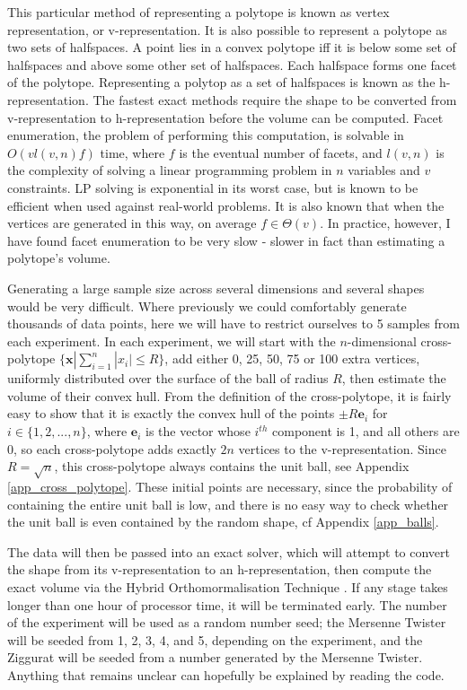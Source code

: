This particular method of representing a polytope is known as vertex representation, or v-representation. It is also possible to represent a polytope as two sets of halfspaces. A point lies in a convex polytope iff it is below some set of halfspaces and above some other set of halfspaces. Each halfspace forms one facet of the polytope. Representing a polytop as a set of halfspaces is known as the h-representation. The fastest exact methods require the shape to be converted from v-representation to h-representation before the volume can be computed. Facet enumeration, the problem of performing this computation, is solvable in $O(vl(v,n)f)$ time\cite{Fukuda97}, where $f$ is the eventual number of facets, and $l(v,n)$ is the complexity of solving a linear programming problem in $n$ variables and $v$ constraints. LP solving is exponential in its worst case\cite{Klee72}, but is known to be efficient when used against real-world problems. It is also known that when the vertices are generated in this way, on average $f \in \Theta(v)$. In practice, however, I have found facet enumeration to be very slow - slower in fact than estimating a polytope's volume.

Generating a large sample size across several dimensions and several shapes would be very difficult. Where previously we could comfortably generate thousands of data points, here we will have to restrict ourselves to 5 samples from each experiment. In each experiment, we will start with the $n$-dimensional cross-polytope $\{{\bm x} | \sum^n_{i=1}|x_i| \leqslant R\}$, add either 0, 25, 50, 75 or 100 extra vertices, uniformly distributed over the surface of the ball of radius $R$, then estimate the volume of their convex hull. From the definition of the cross-polytope, it is fairly easy to show that it is exactly the convex hull of the points $\pm R{\bm e}_i$ for $i \in \{1,2,...,n\}$, where ${\bm e}_i$ is the vector whose $i^{th}$ component is 1, and all others are 0, so each cross-polytope adds exactly $2n$ vertices to the v-representation. Since $R=\sqrt{n}$, this cross-polytope always contains the unit ball, see Appendix \ref{app_cross_polytope}. These initial points are necessary, since the probability of containing the entire unit ball is low, and there is no easy way to check whether the unit ball is even contained by the random shape, cf Appendix \ref{app_balls}.

The data will then be passed into an exact solver, which will attempt to convert the shape from its v-representation to an h-representation, then compute the exact volume via the Hybrid Orthomormalisation Technique \cite{Bueler98}. If any stage takes longer than one hour of processor time, it will be terminated early. The number of the experiment will be used as a random number seed; the Mersenne Twister will be seeded from 1, 2, 3, 4, and 5, depending on the experiment, and the Ziggurat will be seeded from a number generated by the Mersenne Twister. Anything that remains unclear can hopefully be explained by reading the code. %